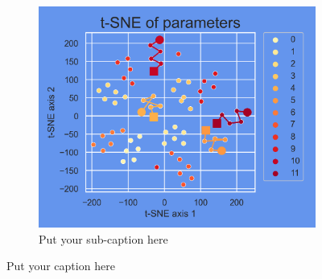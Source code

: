 \begin{figure}[ht]
\begin{subfigure}{.45\textwidth}
		\includegraphics[width=.9\linewidth]{./figs/params_tSNE_2.png}  
		\caption{Put your sub-caption here}
		\label{fig:sub-second}
	\end{subfigure}
	\caption{Put your caption here}
	\label{fig:fig}
\end{figure}

\blindtext

